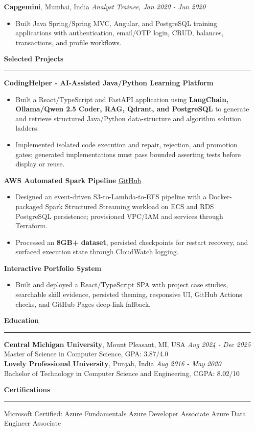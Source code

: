 \documentclass[11pt,letterpaper]{article}
\newcommand{\ressection}[1]{\Needspace{6\baselineskip}\vspace{8pt}\par\textbf{#1}\par\vspace{2pt}\hrule\vspace{5pt}}
\begin{document}
\textbf{Capgemini}, Mumbai, India \hfill \textit{Analyst Trainee, Jan 2020 - Jun 2020}
\begin{itemize}
  \item Built Java Spring/Spring MVC, Angular, and PostgreSQL training applications with authentication, email/OTP login, CRUD, balances, transactions, and profile workflows.
\end{itemize}

\ressection{Selected Projects}
\textbf{CodingHelper - AI-Assisted Java/Python Learning Platform}
\begin{itemize}
  \item Built a React/TypeScript and FastAPI application using \textbf{LangChain, Ollama/Qwen 2.5 Coder, RAG, Qdrant, and PostgreSQL} to generate and retrieve structured Java/Python data-structure and algorithm solution ladders.
  \item Implemented isolated code execution and repair, rejection, and promotion gates; generated implementations must pass bounded asserting tests before display or reuse.
\end{itemize}
\par\vspace{2pt}
\textbf{AWS Automated Spark Pipeline} \hfill \href{https://github.com/preferablehuman/AWS-automated-spark-pipeline}{GitHub}
\begin{itemize}
  \item Designed an event-driven S3-to-Lambda-to-EFS pipeline with a Docker-packaged Spark Structured Streaming workload on ECS and RDS PostgreSQL persistence; provisioned VPC/IAM and services through Terraform.
  \item Processed an \textbf{8GB+ dataset}, persisted checkpoints for restart recovery, and surfaced execution state through CloudWatch logging.
\end{itemize}
\par\vspace{2pt}
\textbf{Interactive Portfolio System}
\begin{itemize}
  \item Built and deployed a React/TypeScript SPA with project case studies, searchable skill evidence, persisted theming, responsive UI, GitHub Actions checks, and GitHub Pages deep-link fallback.
\end{itemize}

\ressection{Education}
\textbf{Central Michigan University}, Mount Pleasant, MI, USA \hfill \textit{Aug 2024 - Dec 2025}\\
Master of Science in Computer Science, GPA: 3.87/4.0\\
\textbf{Lovely Professional University}, Punjab, India \hfill \textit{Aug 2016 - May 2020}\\
Bachelor of Technology in Computer Science and Engineering, CGPA: 8.02/10

\ressection{Certifications}
Microsoft Certified: Azure Fundamentals \textbar{} Azure Developer Associate \textbar{} Azure Data Engineer Associate
\end{document}
